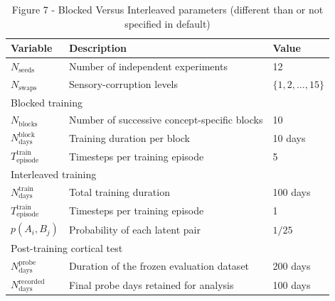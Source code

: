 \documentclass{article}
\begin{document}
\begin{table}[h!]
\centering
\caption{Figure 7 - Blocked Versus Interleaved parameters (different than or not specified in default)}
\label{tab:blocked_interleaved}
\begin{tabular}{lll}
\toprule
\textbf{Variable} & \textbf{Description} & \textbf{Value} \\
\midrule
$N_{\textrm{seeds}}$ & Number of independent experiments & 12 \\
$N_{\textrm{swaps}}$ & Sensory-corruption levels & $\{1,2,\ldots,15\}$ \\
\midrule
\multicolumn{3}{l}{Blocked training} \\
$N_{\textrm{blocks}}$ & Number of successive concept-specific blocks & 10 \\
$N_{\textrm{days}}^{\textrm{block}}$ & Training duration per block & 10 days \\
$T_{\textrm{episode}}^{\textrm{train}}$ & Timesteps per training episode & 5 \\
\midrule
\multicolumn{3}{l}{Interleaved training} \\
$N_{\textrm{days}}^{\textrm{train}}$ & Total training duration & 100 days \\
$T_{\textrm{episode}}^{\textrm{train}}$ & Timesteps per training episode & 1 \\
$p(A_i,B_j)$ & Probability of each latent pair & $1/25$ \\
\midrule
\multicolumn{3}{l}{Post-training cortical test} \\
$N_{\textrm{days}}^{\textrm{probe}}$ & Duration of the frozen evaluation dataset & 200 days \\
$N_{\textrm{days}}^{\textrm{recorded}}$ & Final probe days retained for analysis & 100 days \\
\bottomrule
\end{tabular}
\end{table}
\end{document}

